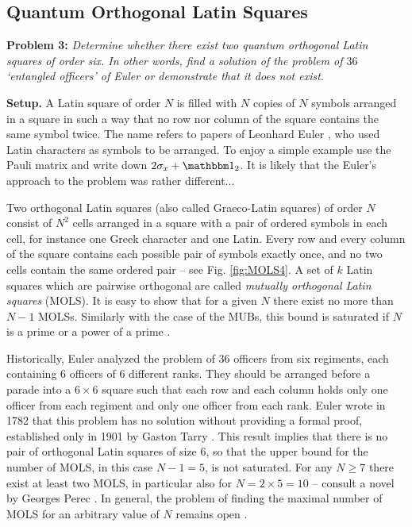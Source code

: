 \documentclass[english,aps,pra,nofootinbib,twocolumn,superscriptaddress]{revtex4-1}
\newcommand{\1}{{\rm 1\hspace{-0.9mm}l}}
\begin{document}
\subsection{Quantum Orthogonal Latin Squares}

{\bf Problem 3:}
{\sl Determine whether there exist two quantum orthogonal Latin squares 
\cite{GRMZ18,MV19} of order six.  In other words,
find a solution of the problem of \; $36$ `entangled officers' of Euler
or demonstrate that it does not exist. }

\bigskip

{\bf Setup.} 
    A Latin square of order $N$ is filled with $N$ copies of $N$ symbols
    arranged in a square in such a way that no row nor column of the square
   contains the same symbol twice. 
   The name refers to papers of Leonhard  Euler \cite{Eu1782},
    who used Latin characters as symbols to be arranged. 
   To enjoy a simple example use the Pauli matrix and write down 
   $2\sigma_x+{\mathbbm 1}_2$. It is likely 
    that the Euler's approach to the problem was rather different...
   
   Two orthogonal Latin squares (also called Graeco-Latin squares)
   of order $N$ consist of $N^2$ cells arranged in a square
   with a pair of ordered symbols in each cell,
   for instance one Greek character and one Latin. 
   Every row and every column of the square
   contains each possible pair of symbols exactly once,   
    and  no two cells contain the same ordered pair -- see Fig.  \ref{fig:MOLS4}.
    A set of $k$ Latin squares which are pairwise orthogonal
    are called {\sl mutually orthogonal Latin squares} (MOLS). 
    It is easy to show that for a given  $N$  there exist no more than 
    $N-1$  MOLSs. 
    Similarly with the case of the MUBs, this bound is saturated if 
    $N$ is a prime or a power of a prime  \cite{DK91}.  
   
Historically,   Euler analyzed the problem of  $36$ officers  
   from six regiments, each containing $6$ officers of $6$ different ranks. 
    They should be arranged before a parade into a 
    $6 \times 6$ square such that each row and each column
    holds only one officer from each regiment and only one officer from each rank.
   Euler wrote in 1782 that this problem has no solution  \cite{Eu1782}
    without providing a formal 
   proof, established  only in 1901 by Gaston Tarry \cite{Ta01}.
   This result implies that there is no pair of orthogonal Latin squares of size $6$, 
   so that the upper bound for the number of MOLS, in this case  $N-1=5$, is not saturated.
   For any  $N\ge 7$ there exist at least two MOLS,
   in particular also for $N=2 \times 5=10$  -- consult a novel by Georges Perec \cite{Pe78}.
    In general,  the problem of finding the maximal number of MOLS for an arbitrary value of $N$ remains open 
    \cite{CD01}.
\end{document}
